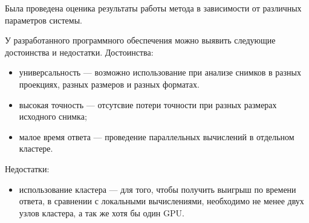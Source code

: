 Была проведена оценика результаты работы метода в зависимости от различных параметров системы.

У разработанного программного обеспечения можно выявить следующие достоинства и недостатки.
Достоинства:
\begin{itemize}[label=---]
    \item универсальность --- возможно использование при анализе снимков в разных проекциях, разных размеров и разных форматах.
    \item высокая точность --- отсутсвие потери точности при разных размерах исходного снимка;
    \item малое время ответа --- проведение параллельных вычислений в отдельном кластере.
\end{itemize}

Недостатки:
\begin{itemize}[label=---]
    \item использование кластера --- для того, чтобы получить выигрыш по времени ответа, в сравнении с локальными вычислениями, необходимо не менее двух узлов кластера, а так же хотя бы один GPU.
\end{itemize}